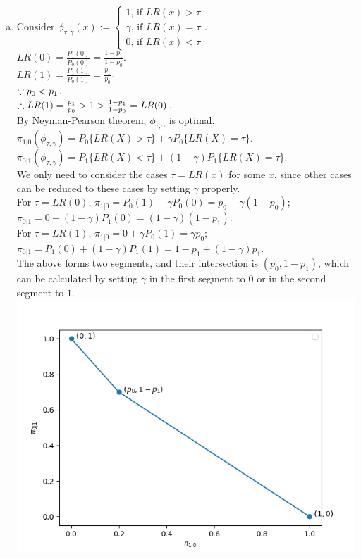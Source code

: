 \begin{pr}$ $
\newcommand{\w}{{\overline\omega}}
\begin{enumerate}[(a)]
\item Consider $\phi_{\tau, \gamma}(x):=\begin{cases}
1\text{, if }LR(x)>\tau\\
\gamma\text{, if }LR(x)=\tau\\
0\text{, if }LR(x)<\tau
\end{cases}$.\\
$LR(0)=\frac{P_1(0)}{P_0(0)}=\frac{1-p_1}{1-p_0}$.\\
$LR(1)=\frac{P_1(1)}{P_0(1)}=\frac{p_1}{p_0}$.\\
$\because p_0<p_1$.\\
$\therefore LR(1)=\frac{p_1}{p_0}>1>\frac{1-p_1}{1-p_0}=LR(0)$.\\
By Neyman-Pearson theorem, $\phi_{\tau, \gamma}$ is optimal.\\
$\pi_{1|0}(\phi_{\tau, \gamma})=P_0\{LR(X)>\tau\}+\gamma P_0\{LR(X)=\tau\}$.\\
$\pi_{0|1}(\phi_{\tau, \gamma})=P_1\{LR(X)<\tau\}+(1-\gamma)P_1\{LR(X)=\tau\}$.\\
We only need to consider the cases $\tau=LR(x)$ for some $x$, since other cases can be reduced to these cases by setting $\gamma$ properly.\\
For $\tau=LR(0)$, $\pi_{1|0}=P_0(1)+\gamma P_0(0)=p_0+\gamma(1-p_0)$; $\pi_{0|1}=0+(1-\gamma)P_1(0)=(1-\gamma)(1-p_1)$.\\
For $\tau=LR(1)$, $\pi_{1|0}=0+\gamma P_0(1)=\gamma p_0$; $\pi_{0|1}=P_1(0)+(1-\gamma)P_1(1)=1-p_1+(1-\gamma)p_1$.\\
The above forms two segments, and their intersection is $(p_0, 1-p_1)$, which can be calculated by setting $\gamma$ in the first segment to $0$ or in the second segment to $1$.\\
\includegraphics[width=15cm]{1a.png}

\end{enumerate}
\end{pr}
